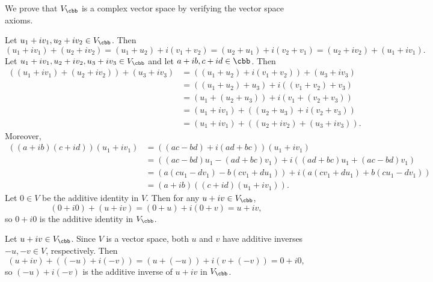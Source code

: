 \begin{sol}
    We prove that $V_{\cbb}$ is a complex vector space by verifying the vector space axioms.

     Let $u_1 + iv_1, u_2 + iv_2 \in V_{\cbb}$.
    Then
    \[
        (u_1 + iv_1) + (u_2 + iv_2) = (u_1 + u_2) + i(v_1 + v_2) = (u_2 + u_1) + i(v_2 + v_1) = (u_2 + iv_2) + (u_1 + iv_1).
    \]
     Let $u_1 + iv_1, u_2 + iv_2, u_3 + iv_3 \in V_{\cbb}$ and let $a + ib, c + id \in \cbb$.
    Then
    \begin{align*}
        ((u_1 + iv_1) + (u_2 + iv_2)) + (u_3 + iv_3) &= ((u_1 + u_2) + i(v_1 + v_2)) + (u_3 + iv_3) \\
        &= ((u_1 + u_2) + u_3) + i((v_1 + v_2) + v_3) \\
        &= (u_1 + (u_2 + u_3)) + i(v_1 + (v_2 + v_3)) \\
        &= (u_1 + iv_1) + ((u_2 + u_3) + i(v_2 + v_3)) \\
        &= (u_1 + iv_1) + ((u_2 + iv_2) + (u_3 + iv_3)).
    \end{align*}
    Moreover,
    \begin{align*}
        ((a + ib)(c + id))(u_1 + iv_1) &= ((ac - bd) + i(ad + bc))(u_1 + iv_1) \\
        &= ((ac - bd)u_1 - (ad + bc)v_1) + i((ad + bc)u_1 + (ac - bd)v_1) \\
        &= (a(cu_1 - dv_1) - b(cv_1 + du_1)) + i(a(cv_1 + du_1) + b(cu_1 - dv_1)) \\
        &= (a + ib)((c + id)(u_1 + iv_1)).
    \end{align*}
     Let $0 \in V$ be the additive identity in $V$.
    Then for any $u + iv \in V_{\cbb}$,
    \[
        (0 + i0) + (u + iv) = (0 + u) + i(0 + v) = u + iv,
    \]
    so $0 + i0$ is the additive identity in $V_{\cbb}$.
    
     Let $u + iv \in V_{\cbb}$.
    Since $V$ is a vector space, both $u$ and $v$ have additive inverses $-u, -v \in V$, respectively.
    Then
    \[
        (u + iv) + ((-u) + i(-v)) = (u + (-u)) + i(v + (-v)) = 0 + i0,
    \]
    so $(-u) + i(-v)$ is the additive inverse of $u + iv$ in $V_{\cbb}$.


\end{sol}
